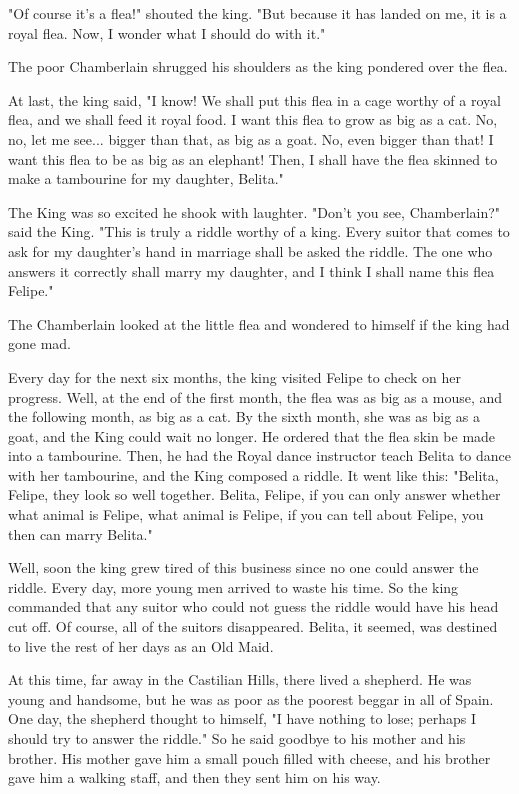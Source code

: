 "Of course it's a flea!" shouted the king. "But because it has landed on me, it is a royal flea. Now, I wonder what I should do with it."

The poor Chamberlain shrugged his shoulders as the king pondered over the flea.

At last, the king said, "I know! We shall put this flea in a cage worthy of a royal flea, and we shall feed it royal food. I want this flea to grow as big as a cat. No, no, let me see... bigger than that, as big as a goat. No, even bigger than that! I want this flea to be as big as an elephant! Then, I shall have the flea skinned to make a tambourine for my daughter, Belita."

The King was so excited he shook with laughter. "Don't you see, Chamberlain?" said the King. "This is truly a riddle worthy of a king. Every suitor that comes to ask for my daughter's hand in marriage shall be asked the riddle. The one who answers it correctly shall marry my daughter, and I think I shall name this flea Felipe."

The Chamberlain looked at the little flea and wondered to himself if the king had gone mad.

Every day for the next six months, the king visited Felipe to check on her progress. Well, at the end of the first month, the flea was as big as a mouse, and the following month, as big as a cat. By the sixth month, she was as big as a goat, and the King could wait no longer. He ordered that the flea skin be made into a tambourine. Then, he had the Royal dance instructor teach Belita to dance with her tambourine, and the King composed a riddle. It went like this: "Belita, Felipe, they look so well together. Belita, Felipe, if you can only answer whether what animal is Felipe, what animal is Felipe, if you can tell about Felipe, you then can marry Belita."

Well, soon the king grew tired of this business since no one could answer the riddle. Every day, more young men arrived to waste his time. So the king commanded that any suitor who could not guess the riddle would have his head cut off. Of course, all of the suitors disappeared. Belita, it seemed, was destined to live the rest of her days as an Old Maid.

At this time, far away in the Castilian Hills, there lived a shepherd. He was young and handsome, but he was as poor as the poorest beggar in all of Spain. One day, the shepherd thought to himself, "I have nothing to lose; perhaps I should try to answer the riddle." So he said goodbye to his mother and his brother. His mother gave him a small pouch filled with cheese, and his brother gave him a walking staff, and then they sent him on his way.

